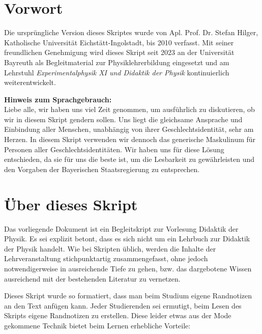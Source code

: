\documentclass[11pt,a4paper]{book}
\begin{document}
\vs{3cm}
\section*{Vorwort}

Die urspr\"ungliche Version dieses Skriptes wurde von Apl. Prof. Dr. Stefan Hilger, Katholische Universit\"{a}t Eichst\"{a}tt-Ingolstadt, bis 2010 verfasst. Mit seiner freundlichen Genehmigung wird dieses Skript seit 2023 an der Universit\"{a}t Bayreuth als Begleitmaterial zur Physiklehrerbildung eingesetzt und am Lehrstuhl \emph{Experimentalphysik XI und Didaktik der Physik} kontinuierlich weiterentwickelt.

\vfill
\textbf{Hinweis zum Sprachgebrauch:} \\
Liebe alle, wir haben uns viel Zeit genommen, um ausführlich zu diskutieren, ob wir in diesem Skript gendern sollen. Uns liegt die gleichsame Ansprache und Einbindung aller Menschen, unabhängig von ihrer Geschlechtsidentität, sehr am Herzen. In diesem Skript verwenden wir dennoch das generische Maskulinum für Personen aller Geschlechtsidentitäten. Wir haben uns für diese Lösung entschieden, da sie für uns die beste ist, um die Lesbarkeit zu gewährleisten und den Vorgaben der Bayerischen Staatsregierung zu entsprechen.

\newpage
\section*{Über dieses Skript}

Das vorliegende Dokument ist ein Begleitskript zur Vorlesung {\glqq}Didaktik der Physik{\grqq}. Es sei explizit betont, dass es sich nicht um ein Lehrbuch zur Didaktik der Physik handelt. Wie bei Skripten \"{u}blich, werden die Inhalte der Lehrveranstaltung stichpunktartig zusammengefasst, ohne jedoch notwendigerweise in ausreichende Tiefe zu gehen, bzw. das dargebotene Wissen ausreichend mit der bestehenden Literatur zu vernetzen. 

\mip

Dieses Skript wurde so formatiert, dass man beim Studium eigene Randnotizen an den Text anf\"{u}gen kann. Jeder Studierenden sei ermutigt, beim Lesen des Skripts eigene Randnotizen zu erstellen. Diese leider etwas aus der Mode gekommene Technik bietet beim Lernen erhebliche Vorteile:
\end{document}
